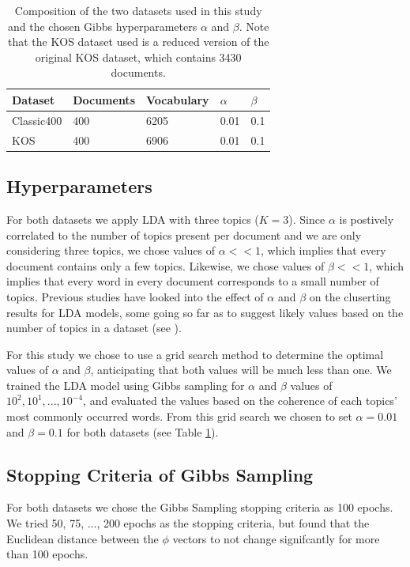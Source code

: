 \documentclass[10pt]{article}
\newcommand{\ra}[1]{\renewcommand{\arraystretch}{#1}}
\begin{document}
\begin{table}[t]
    \centering
    \ra{1.2}
    \begin{tabular}{@{} l l l l l @{}}
        \toprule
        \bf{Dataset} & \bf{Documents} & \bf{Vocabulary} & $\alpha$ & $\beta$ \\
        \midrule
        Classic400 & 400 & 6205 & 0.01 & 0.1 \\
        KOS        & 400 & 6906 & 0.01 & 0.1\\
        \bottomrule
    \end{tabular}
    \caption{Composition of the two datasets used in this study and the chosen Gibbs hyperparameters $\alpha$ and $\beta$. Note that the KOS dataset used is a reduced version of the original KOS dataset, which contains 3430 documents.}
    \label{tab:datasets}
\end{table}


%
%
\subsection{Hyperparameters}
For both datasets we apply LDA with three topics ($K = 3$). Since $\alpha$ is postively correlated to the number of topics present per document and we are only considering three topics, we chose values of $\alpha << 1$, which implies that every document contains only a few topics. Likewise, we chose values of $\beta << 1$, which implies that every word in every document corresponds to a small number of topics. Previous studies have looked into the effect of $\alpha$ and $\beta$ on the cluserting results for LDA models, some going so far as to suggest likely values based on the number of topics in a dataset (see \cite{Griffiths2004}). 


For this study we chose to use a grid search method to determine the optimal values of $\alpha$ and $\beta$, anticipating that both values will be much less than one. We trained the LDA model using Gibbs sampling for $\alpha$ and $\beta$ values of $10^2, 10^1, ..., 10^{-4}$, and evaluated the values based on the coherence of each topics' most commonly occurred words. From this grid search we chosen to set $\alpha = 0.01$ and $\beta = 0.1$ for both datasets (see Table \ref{tab:datasets}).


%
%
\subsection{Stopping Criteria of Gibbs Sampling}
For both datasets we chose the Gibbs Sampling stopping criteria as 100 epochs. We tried 50, 75, ..., 200 epochs as the stopping criteria, but found that the Euclidean distance between the $\phi$ vectors to not change signifcantly for more than 100 epochs.
\end{document}
